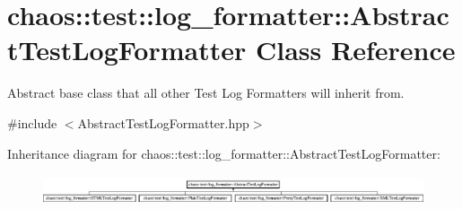 \hypertarget{classchaos_1_1test_1_1log__formatter_1_1_abstract_test_log_formatter}{}\section{chaos\+:\+:test\+:\+:log\+\_\+formatter\+:\+:Abstract\+Test\+Log\+Formatter Class Reference}
\label{classchaos_1_1test_1_1log__formatter_1_1_abstract_test_log_formatter}


Abstract base class that all other Test Log Formatters will inherit from.  




{\ttfamily \#include $<$Abstract\+Test\+Log\+Formatter.\+hpp$>$}

Inheritance diagram for chaos\+:\+:test\+:\+:log\+\_\+formatter\+:\+:Abstract\+Test\+Log\+Formatter\+:\begin{figure}[H]
\begin{center}
\leavevmode
\includegraphics[height=0.903226cm]{classchaos_1_1test_1_1log__formatter_1_1_abstract_test_log_formatter}
\end{center}
\end{figure}
